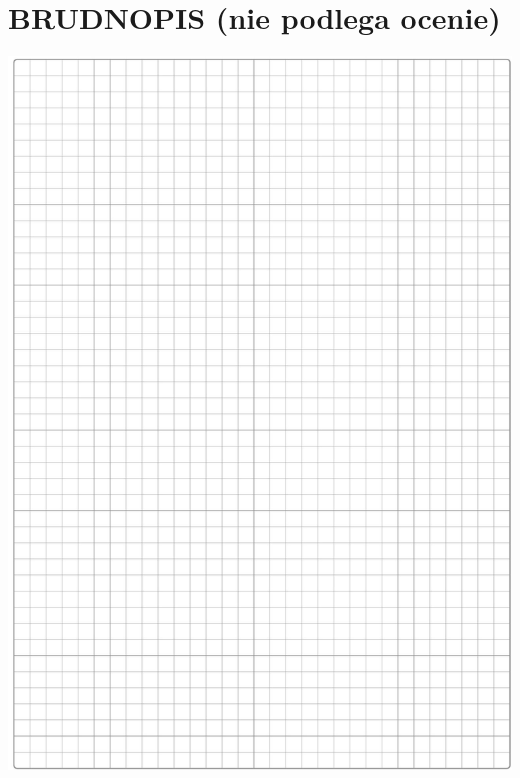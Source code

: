 \documentclass[10pt]{article}
\begin{document}
\section*{BRUDNOPIS (nie podlega ocenie)}
\begin{center}
\includegraphics[max width=\textwidth]{2024_11_21_a38d702bc7be8115942cg-14}
\end{center}
\end{document}
